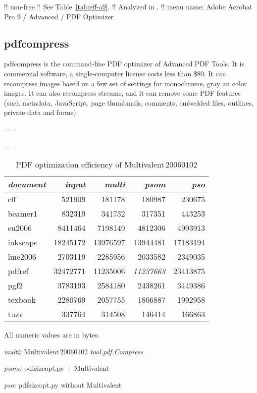 \documentclass{ltugproc}
\def\cmd{\textsf}
\def\captiontop#1{%
  \advance\abovecaptionskip-\belowcaptionskip
  \advance\belowcaptionskip\abovecaptionskip
  \advance\abovecaptionskip-\belowcaptionskip
  \abovecaptionskip-\abovecaptionskip
  \caption{#1}%
  \advance\abovecaptionskip-\belowcaptionskip
  \advance\belowcaptionskip\abovecaptionskip
  \advance\abovecaptionskip-\belowcaptionskip
  \abovecaptionskip-\abovecaptionskip
}
\begin{document}
!! non-free
!! See Table~\ref{tab:eff-a9}.
!! Analyzed in \cite{pdftweak}.
!! menu name: Adobe Acrobat Pro 9 / Advanced / PDF Optimizer


\subsection{pdfcompress}

\cmd{pdfcompress} \cite{pdfcompress} is the command-line PDF optimizer of
Advanced PDF Tools. It is commercial software, a single-computer license
costs less than \$80. It can recompress images based on a few set of
settings for monochrome, gray an color images. It can also recompress
streams, and it can remove some PDF features (such metadata, JavaScript,
page thumbnails, comments, embedded files, outlines, private data and
forms).



\begin{table}
\captiontop{PDF optimization efficiency
of Multivalent\,20060102}\label{tab:eff-multivalent}
\par\small\noindent\hfil
\advance\tabcolsep-2pt  %
\begin{tabular}{@{}lrrrr@{}}
\toprule
\emph{document} & \emph{input} & \emph{multi} & \emph{psom} & \emph{pso} \\\midrule
cff         &   521909 &    181178 &    180987 &   230675 \\
beamer1     &   832319 &    341732 &    317351 &   443253 \\
eu2006      &  8411464 &   7198149 &   4812306 &  4993913 \\
inkscape    & 18245172 &  13976597 &  13944481 & 17183194 \\
lme2006     &  2703119 &   2285956 &   2033582 &  2349035 \\
pdfref      & 32472771 &  11235006 &  \emph{11237663} & 23413875 \\
pgf2        &  3783193 &   2584180 &   2438261 &  3449386 \\
texbook     &  2280769 &   2057755 &   1806887 &  1992958 \\
tuzv        &   337764 &    314508 &    146414 &   166863 \\
\bottomrule
\end{tabular}
\par\bigskip
\par\noindent All numeric values are in bytes.
\par\noindent\emph{multi:} Multivalent\,20060102 \emph{tool.pdf.Compress}
\par\noindent\emph{psom:} \cmd{pdfsizeopt.py} $+$ Multivalent
\par\noindent\emph{pso:} \cmd{pdfsizeopt.py} without Multivalent
\end{table}
\end{document}
